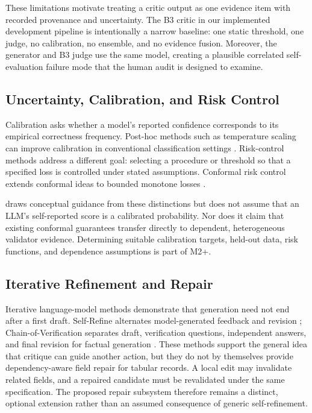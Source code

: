 These limitations motivate treating a critic output as one evidence item with
recorded provenance and uncertainty. The B3 critic in our implemented
development pipeline is intentionally a narrow baseline: one static threshold,
one judge, no calibration, no ensemble, and no evidence fusion. Moreover, the
generator and B3 judge use the same model, creating a plausible correlated
self-evaluation failure mode that the human audit is designed to examine.

\subsection{Uncertainty, Calibration, and Risk Control}

Calibration asks whether a model's reported confidence corresponds to its
empirical correctness frequency. Post-hoc methods such as temperature scaling
can improve calibration in conventional classification settings
\citep{guo2017calibration}. Risk-control methods address a different goal:
selecting a procedure or threshold so that a specified loss is controlled
under stated assumptions. Conformal risk control extends conformal ideas to
bounded monotone losses \citep{angelopoulos2022conformal}.

\rcqasyn{} draws conceptual guidance from these distinctions but does not
assume that an LLM's self-reported score is a calibrated probability. Nor does
it claim that existing conformal guarantees transfer directly to dependent,
heterogeneous validator evidence. Determining suitable calibration targets,
held-out data, risk functions, and dependence assumptions is part of M2+.

\subsection{Iterative Refinement and Repair}

Iterative language-model methods demonstrate that generation need not end
after a first draft. Self-Refine alternates model-generated feedback and
revision \citep{madaan2023selfrefine}; Chain-of-Verification separates draft,
verification questions, independent answers, and final revision for factual
generation \citep{dhuliawala2024chain}. These methods support the general idea
that critique can guide another action, but they do not by themselves provide
dependency-aware field repair for tabular records. A local edit may invalidate
related fields, and a repaired candidate must be revalidated under the same
specification. The proposed repair subsystem therefore remains a distinct,
optional extension rather than an assumed consequence of generic
self-refinement.

